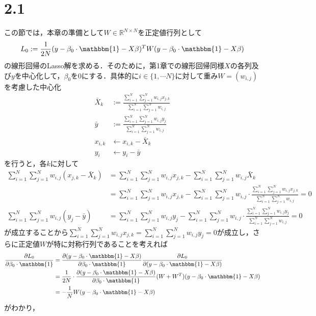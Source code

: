 \documentclass{jsarticle}
\theoremstyle{definition}
\theoremstyle{mystyle} %
\begin{document}
\Large
\section*{2.1}
この節では，本章の準備として$W\in\mathbb{R}^{N\times N}$を正定値行列として
\begin{align}
\label{eru}
L_0:=\frac{1}{2N}(y-\beta_0\cdot \mathbbm{1}-X\beta)^T W(y-\beta_0\cdot \mathbbm{1}-X\beta)
\end{align}
の線形回帰のLasso解を求める．そのために，第1章での線形回帰同様$X$の各列及び$y$を中心化して，$\beta_0$を$0$にする．具体的に$i\in\{1,\cdots N\}$に対して重み$W=(w_{i,j})$を考慮した中心化
\begin{align*}
\bar{X}_k&:=\frac{\sum_{i=1}^N\sum_{j=1}^Nw_{i,j}x_{j,k}}{\sum_{i=1}^N\sum_{j=1}^Nw_{i,j}}\\
\bar{y}&:=\frac{\sum_{i=1}^N\sum_{j=1}^Nw_{i,j}y_j}{\sum_{i=1}^N\sum_{j=1}^Nw_{i,j}}\\
x_{i,k}&\gets x_{i,k}-\bar{X}_k\\
y_i&\gets y_i-\bar{y}
\end{align*}
を行うと，各$k$に対して
\begin{align*}
\sum_{i=1}^N\sum_{j=1}^Nw_{i,j}\left(x_{j,k}-\bar{X}_k\right)&=\sum_{i=1}^N\sum_{j=1}^Nw_{i,j}x_{j,k}-\sum_{i=1}^N\sum_{j=1}^Nw_{i,j}\bar{X}_k\\
&=\sum_{i=1}^N\sum_{j=1}^Nw_{i,j}x_{j,k}-\sum_{i=1}^N\sum_{j=1}^Nw_{i,j}\cdot \frac{\sum_{i=1}^N\sum_{j=1}^Nw_{i,j}x_{j,k}}{\sum_{i=1}^N\sum_{j=1}^Nw_{i,j}}=0\\
\sum_{i=1}^N\sum_{j=1}^Nw_{i,j}(y_j-\bar{y})&=\sum_{i=1}^N\sum_{j=1}^Nw_{i,j}y_j-\sum_{i=1}^N\sum_{j=1}^Nw_{i,j}\cdot \frac{\sum_{i=1}^N\sum_{j=1}^Nw_{i,j}y_j}{\sum_{i=1}^N\sum_{j=1}^Nw_{i,j}}=0
\end{align*}
が成立することから$\displaystyle\sum_{i=1}^N\sum_{j=1}^Nw_{i,j}x_{j,k}=\sum_{i=1}^N\sum_{j=1}^Nw_{i,j}y_j=0$が成立し，さらに正定値$W$が特に対称行列であることを考えれば
\begin{align*}
\frac{\partial L_0}{\partial \beta_0\cdot\mathbbm{1}}&=\frac{\partial (y-\beta_0\cdot\mathbbm{1}-X\beta)}{\partial \beta_0\cdot\mathbbm{1}}\frac{\partial L_0}{\partial(y-\beta_0\cdot\mathbbm{1}-X\beta)}\\
&=\frac{1}{2N}\cdot \frac{\partial (y-\beta_0\cdot\mathbbm{1}-X\beta)}{\partial \beta_0\cdot\mathbbm{1}}(W+W^T)(y-\beta_0\cdot\mathbbm{1}-X\beta)\\
&=-\frac{1}{N}W(y-\beta_0\cdot\mathbbm{1}-X\beta)
\end{align*}
がわかり，
\end{document}
